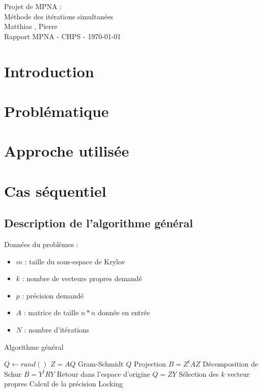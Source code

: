 \documentclass[11pt,a4paper]{article}
\begin{document}
\begin{center}

	{\LARGE\centering Projet de MPNA :\\ Méthode des itérations simultanées}\\[1cm]

	{ Matthias , Pierre }\\[0.5cm]
	{Rapport MPNA - CHPS - \today}
\end{center}

\tableofcontents

\section{Introduction}

\section{Problématique}

\section{Approche utilisée}

\section{Cas séquentiel}

	\subsection{Description de l'algorithme général}

		Données du problèmes :

		\begin{itemize}
			\item $m$ : taille du sous-espace de Krylov
			\item $k$ : nombre de vecteurs propres demandé
			\item $p$ : précision demandé
			\item $A$ : matrice de taille $n*n$ donnée en entrée
			\item $N$ : nombre d'itérations
		\end{itemize}

		\begin{algorithm}
			\caption{Algorithme général}
			\begin{algorithmic}[1]
					\State $Q \gets rand()$
						\State $Z = AQ$
						\State Gram-Schmidt $Q$
						\State Projection $B = Z^tAZ$
						\State Décomposition de Schur $B = Y^tRY$
						\State Retour dans l'espace d'origine $Q = ZY$
						\State Sélection des $k$ vecteur propres
						\State Calcul de la précision
						\State Locking
					\EndWhile
				\end{algorithmic}
		\end{algorithm}
\end{document}
